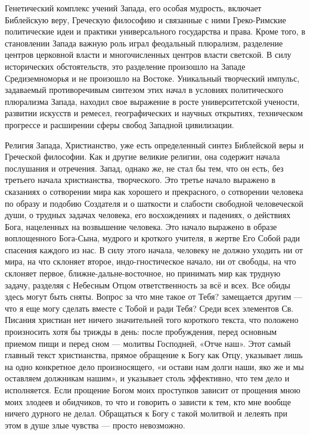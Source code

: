 \begin{multicols}{3}

Генетический комплекс учений Запада, его особая мудрость, включает Библейскую
веру, Греческую философию и связанные с ними Греко-Римские политические идеи и
практики универсального государства и права. Кроме того, в становлении Запада
важную роль играл феодальный плюрализм, разделение центров церковной власти и
многочисленных центров власти светской. В силу исторических обстоятельств, это
разделение произошло на Западе Средиземноморья и не произошло на Востоке.
Уникальный творческий импульс, задаваемый противоречивым синтезом этих начал в
условиях политического плюрализма Запада, находил свое выражение в росте
университетской учености, развитии искусств и ремесел, географических и научных
открытиях, техническом прогрессе и расширении сферы свобод Западной
цивилизации.    

Религия Запада, Христианство, уже есть определенный синтез Библейской веры и
Греческой философии. Как и другие великие религии, она содержит начала
послушания и отречения. Запад, однако же, не стал бы тем, что он есть, без
третьего начала христианства, творческого. Это третье начало выражено в
сказаниях о сотворении мира как хорошего и прекрасного, о сотворении человека
по образу и подобию Создателя и о шаткости и слабости свободной человеческой
души, о трудных задачах человека, его восхождениях и падениях, о действиях
Бога, нацеленных на  возвышение человека. Это начало выражено в образе
воплощенного Бога-Сына, мудрого и кроткого учителя, в жертве Его Собой ради
спасения каждого из нас. В силу этого начала, человеку не должно уходить ни от
мира, на что склоняет второе, индо-гностическое начало, ни от свободы, на что
склоняет первое, ближне-дальне-восточное, но принимать мир как трудную задачу,
разделяя с Небесным Отцом ответственность за всё и всех. Все обиды здесь могут
быть сняты. Вопрос за что мне такое от Тебя? замещается другим — что я еще могу
сделать вместе с Тобой и ради Тебя? Среди всех элементов Св. Писания христиан
нет ничего значительней того короткого текста, что положено произносить хотя бы
трижды в день: после пробуждения, перед основным приемом пищи и перед сном —
молитвы Господней, «Отче наш». Этот самый главный текст христианства, прямое
обращение к Богу как Отцу, указывает лишь на одно конкретное дело
произносящего, «и остави нам долги наши, яко же и мы оставляем должникам
нашим», и указывает столь эффективно, что тем дело и исполняется. Если прощение
Богом моих проступков зависит от прощения мною моих злодеев и обидчиков, то что
и говорить о зависти к тем, кто мне вообще ничего дурного не делал. Обращаться
к Богу с такой молитвой и лелеять при этом в душе злые чувства — просто
невозможно.


\end{multicols}
